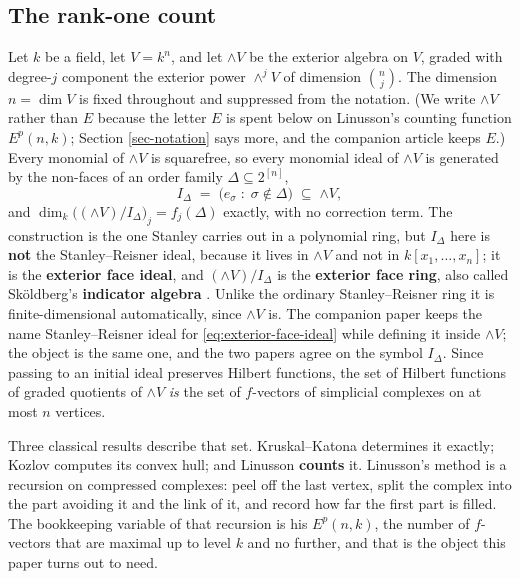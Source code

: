 \documentclass[11pt, a4paper, abstract=yes]{scrartcl}
\theoremstyle{definition}
\theoremstyle{remark}
\theoremstyle{plain}
\newcommand{\Ext}{\mathord{\wedge }V}
\begin{document}
\subsection{The rank-one count}
\label{sec:org606d2b1}

Let \(k\) be a field, let \(V=k^n\), and let \(\Ext\) be the exterior algebra on \(V\), graded with
degree-\(j\) component the exterior power \(\wedge^jV\) of dimension \(\binom nj\). The dimension
\(n=\dim V\) is fixed throughout and suppressed from the notation. (We write \(\Ext\) rather than
\(E\) because the letter \(E\) is spent below on Linusson's counting function \(E^p(n,k)\);
Section \ref{sec-notation} says more, and the companion article keeps \(E\).) Every monomial of \(\Ext\) is
squarefree, so every monomial ideal of \(\Ext\) is generated by the non-faces of an order family
\(\Delta\subseteq2^{[n]}\),
\begin{equation}\label{eq:exterior-face-ideal}
  I_\Delta\;=\;\bigl(e_\sigma\;:\;\sigma\notin\Delta\bigr)\;\subseteq\;\Ext ,
\end{equation}
and \(\dim_k\bigl((\Ext)/I_\Delta\bigr)_j=f_j(\Delta)\) exactly, with no correction term. The construction is the
one Stanley \autocite{Stanley1996} carries out in a polynomial ring, but \(I_\Delta\) here is \textbf{not} the
Stanley--Reisner ideal, because it lives in \(\Ext\) and not in \(k[x_1,\dots,x_n]\); it is the
\textbf{exterior face ideal}, and \((\Ext)/I_\Delta\) is the \textbf{exterior face ring}, also called Sköldberg's
\textbf{indicator algebra} \autocite{Skoldberg1999}. Unlike the ordinary Stanley--Reisner ring it is
finite-dimensional automatically, since \(\Ext\) is. The companion paper keeps the name
Stanley--Reisner ideal for \eqref{eq:exterior-face-ideal} while defining it inside \(\Ext\); the object
is the same one, and the two papers agree on the symbol \(I_\Delta\). Since passing to
an initial ideal preserves Hilbert functions, the set of Hilbert functions of graded quotients of
\(\Ext\) \emph{is} the set of \(f\)-vectors of simplicial complexes on at most \(n\) vertices.

Three classical results describe that set. Kruskal--Katona \autocite{Kruskal1963,Katona1968} determines it exactly; Kozlov \autocite{Kozlov1997}
computes its convex hull; and Linusson \autocite{Linusson1999} \textbf{counts} it. Linusson's method is a recursion on
compressed complexes: peel off the last vertex, split the complex into the part avoiding it and the
link of it, and record how far the first part is filled. The bookkeeping variable of that recursion
is his \(E^p(n,k)\), the number of \(f\)-vectors that are maximal up to level \(k\) and no
further, and that is the object this paper turns out to need.
\end{document}
